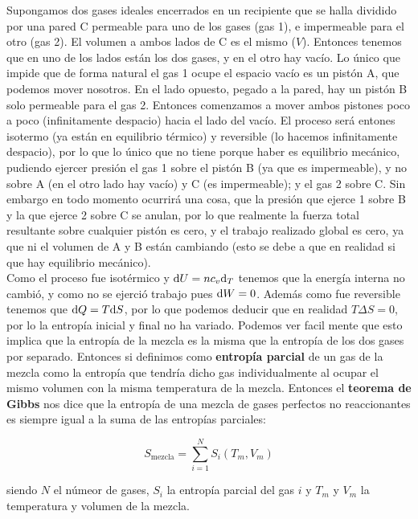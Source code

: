 \documentclass[12pt,a4paper]{article}
\begin{document}
Supongamos dos gases ideales encerrados en un recipiente que se halla dividido por una pared C permeable para uno de los gases (gas 1), e impermeable para el otro (gas 2). El volumen a ambos lados de C es el mismo ($V$). Entonces tenemos que en uno de los lados están los dos gases, y en el otro hay vacío. Lo único que impide que de forma natural el gas 1 ocupe el espacio vacío es un pistón A, que podemos mover nosotros. En el lado opuesto, pegado a la pared, hay un pistón B solo permeable para el gas 2. Entonces comenzamos a mover ambos pistones poco a poco (infinitamente despacio) hacia el lado del vacío. El proceso será entones isotermo (ya están en equilibrio térmico) y reversible (lo hacemos infinitamente despacio), por lo que lo único que no tiene porque haber es equilibrio mecánico, pudiendo ejercer presión el gas 1 sobre el pistón B (ya que es impermeable), y no sobre A (en el otro lado hay vacío) y C (es impermeable); y el gas 2 sobre C. Sin embargo en todo momento ocurrirá una cosa, que la presión que ejerce 1 sobre B y la que ejerce 2 sobre C se anulan, por lo que realmente la fuerza total resultante sobre cualquier pistón es cero, y el trabajo realizado global es cero, ya que ni el volumen de A y B están cambiando (esto se debe a que en realidad si que hay equilibrio mecánico).  \\

Como el proceso fue isotérmico y $\mathrm{d} U =  n c_v  \mathrm{d}_T$ tenemos que la energía interna no cambió, y como no se ejerció trabajo pues $\mathrm{d} W = 0$. Además como fue reversible tenemos que $\mathrm{d} Q = T \mathrm{d} S$, por lo que podemos deducir que en realidad $T \Delta S = 0$, por lo la entropía inicial y final no ha variado. Podemos ver facil mente que esto implica que la entropía de la mezcla es la misma que la entropía de los dos gases por separado. Entonces si definimos como \textbf{entropía parcial} de un gas de la mezcla como la entropía que tendría dicho gas individualmente al ocupar el mismo volumen con la misma temperatura de la mezcla. Entonces el \textbf{teorema de Gibbs} nos dice que la entropía de una mezcla de gases perfectos no reaccionantes es siempre igual a la suma de las entropías parciales:

\begin{equation}
S_{\mathrm{mezcla}}= \sum_{i=1}^N S_i (T_m,V_m) 
\end{equation}

siendo $N$ el númeor de gases, $S_i$ la entropía parcial del gas $i$ y $T_m$ y $V_m$ la temperatura y volumen de la mezcla.
\end{document}
